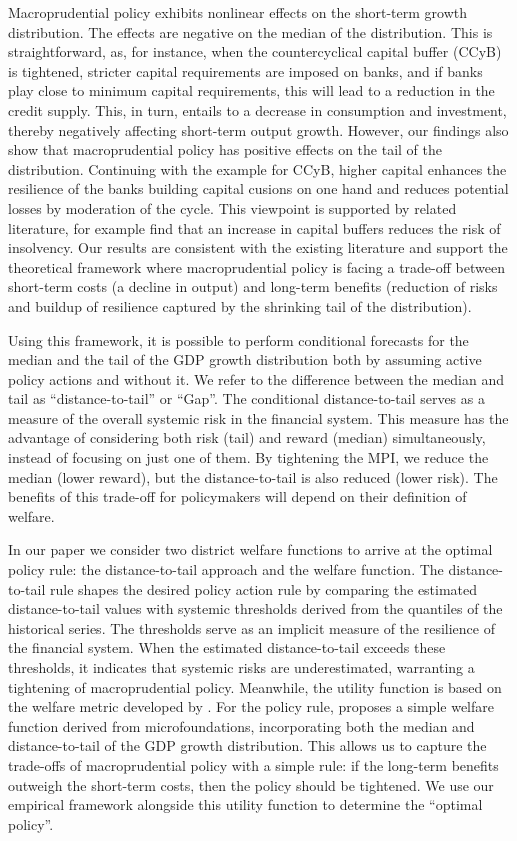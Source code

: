 \documentclass[12pt,a4paper]{article}
\begin{document}
Macroprudential policy exhibits nonlinear effects on the short-term growth distribution. The effects are negative on the median of the distribution. This is straightforward, as, for instance, when the countercyclical capital buffer (CCyB) is tightened, stricter capital requirements are imposed on banks, and if banks play close to minimum capital requirements, this will lead to a reduction in the credit supply. This, in turn, entails to a decrease in consumption and investment, thereby negatively affecting short-term output growth. However, our findings also show that macroprudential policy has positive effects on the tail of the distribution. Continuing with the example for CCyB, higher capital enhances the resilience of the banks building capital cusions on one hand and reduces potential losses by moderation of the cycle. This viewpoint is supported by related literature, for example \citet{jimnez2017} find that an increase in capital buffers reduces the risk of insolvency. Our results are consistent with the existing literature \citep{galan2020} and support the theoretical framework where macroprudential policy is facing a trade-off between short-term costs (a decline in output) and long-term benefits (reduction of risks and buildup of resilience captured by the shrinking tail of the distribution).

Using this framework, it is possible to perform conditional forecasts for the median and the tail of the GDP growth distribution both by assuming active policy actions and without it. We refer to the difference between the median and tail as ``distance-to-tail'' or ``Gap''. The conditional distance-to-tail serves as a measure of the overall systemic risk in the financial system. This measure has the advantage of considering both risk (tail) and reward (median) simultaneously, instead of focusing on just one of them. By tightening the MPI, we reduce the median (lower reward), but the distance-to-tail is also reduced (lower risk). The benefits of this trade-off for policymakers will depend on their definition of welfare.

In our paper we consider two district welfare functions to arrive at the optimal policy rule: the distance-to-tail approach \citep{esrb2024} and the \citet{suarez2022} welfare function. The distance-to-tail rule shapes the desired policy action rule by comparing the estimated distance-to-tail values with systemic thresholds derived from the quantiles of the historical series. The thresholds serve as an implicit measure of the resilience of the financial system. When the estimated distance-to-tail exceeds these thresholds, it indicates that systemic risks are underestimated, warranting a tightening of macroprudential policy. Meanwhile, the utility function is based on the welfare metric developed by \citet{suarez2022}. For the policy rule, \citet{suarez2022} proposes a simple welfare function derived from microfoundations, incorporating both the median and distance-to-tail of the GDP growth distribution. This allows us to capture the trade-offs of macroprudential policy with a simple rule: if the long-term benefits outweigh the short-term costs, then the policy should be tightened. We use our empirical framework alongside this utility function to determine the ``optimal policy''.
\end{document}
